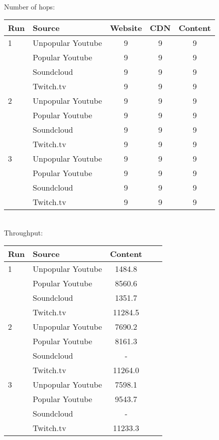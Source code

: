 \documentclass{sig-alternate-05-2015}
\begin{document}
\vspace{1em} \\
Number of hops: \\
\begin{tabular}{|l|l|c|c|c|} \hline
Run & Source & Website & CDN & Content \\ \hline
1 & Unpopular Youtube & 9 & 9 & 9 \\ \hline
  & Popular Youtube   & 9 & 9 & 9 \\ \hline
  & Soundcloud        & 9 & 9 & 9 \\ \hline
  & Twitch.tv         & 9 & 9 & 9 \\ \hline
2 & Unpopular Youtube & 9 & 9 & 9 \\ \hline
  & Popular Youtube   & 9 & 9 & 9 \\ \hline
  & Soundcloud        & 9 & 9 & 9 \\ \hline
  & Twitch.tv         & 9 & 9 & 9 \\ \hline
3 & Unpopular Youtube & 9 & 9 & 9 \\ \hline
  & Popular Youtube   & 9 & 9 & 9 \\ \hline
  & Soundcloud        & 9 & 9 & 9 \\ \hline
  & Twitch.tv         & 9 & 9 & 9 \\ \hline
\end{tabular}
\vspace{1em} \\
Throughput: \\
\begin{tabular}{|l|l|c|c|c|} \hline
Run & Source & Content \\ \hline
1 & Unpopular Youtube & 1484.8  \\ \hline
  & Popular Youtube   & 8560.6  \\ \hline
  & Soundcloud        & 1351.7  \\ \hline
  & Twitch.tv         & 11284.5 \\ \hline
2 & Unpopular Youtube & 7690.2  \\ \hline
  & Popular Youtube   & 8161.3  \\ \hline
  & Soundcloud        & -       \\ \hline
  & Twitch.tv         & 11264.0 \\ \hline
3 & Unpopular Youtube & 7598.1  \\ \hline
  & Popular Youtube   & 9543.7  \\ \hline
  & Soundcloud        & -       \\ \hline  
  & Twitch.tv         & 11233.3 \\ \hline
\end{tabular}
\end{document}
